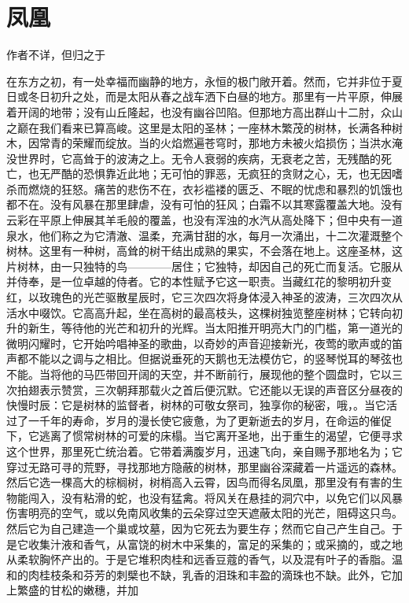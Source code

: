 
\chapter{凤凰}


作者不详，但归之于\par

在东方之初，有一处幸福而幽静的地方，永恒的极门敞开着。然而，它并非位于夏日或冬日初升之处，而是太阳从春之战车洒下白昼的地方。那里有一片平原，伸展着开阔的地带；没有山丘隆起，也没有幽谷凹陷。但那地方高出群山十二肘，众山之巅在我们看来已算高峻。这里是太阳的圣林；一座林木繁茂的树林，长满各种树木，因常青的荣耀而绽放。当的火焰燃遍苍穹时，那地方未被火焰损伤；当洪水淹没世界时，它高耸于的波涛之上。无令人衰弱的疾病，无衰老之苦，无残酷的死亡，也无严酷的恐惧靠近此地；无可怕的罪恶，无疯狂的贪财之心，无，也无因嗜杀而燃烧的狂怒。痛苦的悲伤不在，衣衫褴褛的匮乏、不眠的忧虑和暴烈的饥饿也都不在。没有风暴在那里肆虐，没有可怕的狂风；白霜不以其寒露覆盖大地。没有云彩在平原上伸展其羊毛般的覆盖，也没有浑浊的水汽从高处降下；但中央有一道泉水，他们称之为它清澈、温柔，充满甘甜的水，每月一次涌出，十二次灌溉整个树林。这里有一种树，高耸的树干结出成熟的果实，不会落在地上。这座圣林，这片树林，由一只独特的鸟————居住；它独特，却因自己的死亡而复活。它服从并侍奉，是一位卓越的侍者。它的本性赋予它这一职责。当藏红花的黎明初升变红，以玫瑰色的光芒驱散星辰时，它三次四次将身体浸入神圣的波涛，三次四次从活水中啜饮。它高高升起，坐在高树的最高枝头，这棵树独览整座树林；它转向初升的新生，等待他的光芒和初升的光辉。当太阳推开明亮大门的门槛，第一道光的微明闪耀时，它开始吟唱神圣的歌曲，以奇妙的声音迎接新光，夜莺的歌声或的笛声都不能以之调与之相比。但据说垂死的天鹅也无法模仿它，的竖琴悦耳的琴弦也不能。当将他的马匹带回开阔的天空，并不断前行，展现他的整个圆盘时，它以三次拍翅表示赞赏，三次朝拜那载火之首后便沉默。它还能以无误的声音区分昼夜的快慢时辰：它是树林的监督者，树林的可敬女祭司，独享你的秘密，哦，。当它活过了一千年的寿命，岁月的漫长使它疲惫，为了更新逝去的岁月，在命运的催促下，它逃离了惯常树林的可爱的床榻。当它离开圣地，出于重生的渴望，它便寻求这个世界，那里死亡统治着。它带着满腹岁月，迅速飞向，亲自赐予那地名为；它穿过无路可寻的荒野，寻找那地方隐蔽的树林，那里幽谷深藏着一片遥远的森林。然后它选一棵高大的棕榈树，树梢高入云霄，因鸟而得名凤凰，那里没有有害的生物能闯入，没有粘滑的蛇，也没有猛禽。将风关在悬挂的洞穴中，以免它们以风暴伤害明亮的空气，或以免南风收集的云朵穿过空天遮蔽太阳的光芒，阻碍这只鸟。然后它为自己建造一个巢或坟墓，因为它死去为要生存；然而它自己产生自己。于是它收集汁液和香气，从富饶的树木中采集的，富足的采集的；或采摘的，或之地从柔软胸怀产出的。于是它堆积肉桂和远香豆蔻的香气，以及混有叶子的香脂。温和的肉桂枝条和芬芳的刺檗也不缺，乳香的泪珠和丰盈的滴珠也不缺。此外，它加上繁盛的甘松的嫩穗，并加